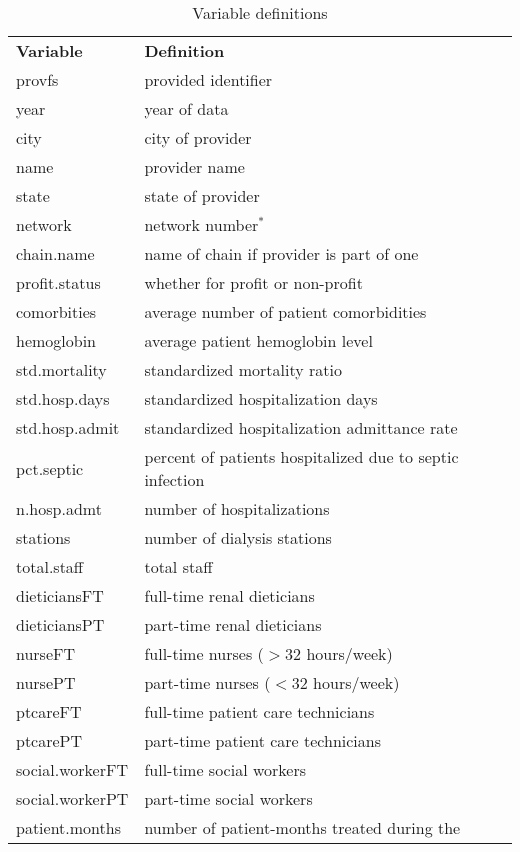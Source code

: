 \documentclass[11pt,reqno,letter]{article}
\theoremstyle{definition}
\theoremstyle{problem}
\begin{document}
\begin{table}\caption{Variable definitions\label{tab:def} }
  \begin{minipage}{\linewidth}
    \begin{tabular}{ll}
    \textbf{Variable} & \textbf{Definition} \\
      provfs & provided identifier \\ 
      year & year of data \\
      city & city of provider \\
      name & provider name \\
      state & state of provider \\
      network & network number$^{*}$ \\
      chain.name & name of chain if provider is part of one \\
      profit.status & whether for profit or non-profit \\
      comorbities & average number of patient comorbidities \\
      hemoglobin & average patient hemoglobin level \\
      std.mortality & standardized mortality ratio \\
      std.hosp.days & standardized hospitalization days \\
      std.hosp.admit & standardized hospitalization admittance rate \\
      pct.septic & percent of patients hospitalized due to septic infection \\
      n.hosp.admt & number of hospitalizations \\
      stations & number of dialysis stations \\
      total.staff & total staff \\
      dieticiansFT & full-time renal dieticians \\
      dieticiansPT & part-time renal dieticians \\ 
      nurseFT & full-time nurses ($>32$ hours/week) \\
      nursePT & part-time nurses ($<32$ hours/week) \\
      ptcareFT & full-time patient care technicians \\
      ptcarePT & part-time patient care technicians \\
      social.workerFT & full-time social workers \\
      social.workerPT & part-time social workers \\
      patient.months & number of patient-months treated during the

\end{tabular}
\end{minipage}
\end{table}
\end{document}
